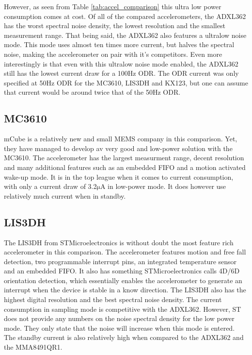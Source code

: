 However, as seen from Table \ref{tab:accel_comparison} this ultra low power consumption comes at cost. Of all of the compared accelerometers, the ADXL362 has the worst spectral noise density, the lowest resolution and the smallest measurement range. That being said, the ADXL362 also features a ultralow noise mode. This mode uses almost ten times more current, but halves the spectral noise, making the accelerometer on pair with it's competitors. Even more interestingly is that even with this ultralow noise mode enabled, the ADXL362 still has the lowest current draw for a 100Hz ODR. The ODR current was only specified at 50Hz ODR for the MC3610, LIS3DH and KX123, but one can assume that current would be around twice that of the 50Hz ODR.

\subsection{MC3610}
mCube is a relatively new and small MEMS company in this comparison. Yet, they have managed to develop av very good and low-power solution with the MC3610. The accelerometer has the largest measurment range, decent resolution and many additional features such as an embedded FIFO and a motion activated wake-up mode. It is in the top league when it comes to current consumption, with only a current draw of 3.2$\si{\micro\ampere}$ in low-power mode. It does however use relatively much current when in standby.

\subsection{LIS3DH}

The LIS3DH from STMicroelectronics is without doubt the most feature rich accelerometer in this comparison. The accelerometer features motion and free fall detection, two programmable interrupt pins, an integrated temperature sensor and an embedded FIFO. It also has something STMicroelectronics calls 4D/6D orientation detection, which essentially enables the accelerometer to generate an interrupt when the device is stable in a know direction. The LIS3DH also has the highest digital resolution and the best spectral noise density. The current consumption in sampling mode is competitive with the ADXL362. However, ST does not provide any numbers on the noise spectral density for the low power mode. They only state that the noise will increase when this mode is entered. The standby current is also relatively high when compared to the ADXL362 and the MMA8491QR1. 

